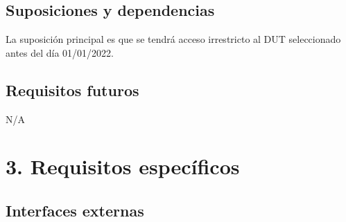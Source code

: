 \documentclass[
11pt, %
codirector, %
]{charter}
\begin{document}
\subsection{Suposiciones y dependencias}
\label{sub:suposiciones}

La suposición principal es que se tendrá acceso irrestricto al DUT seleccionado antes del día 01/01/2022.

\subsection{Requisitos futuros}
\label{sub:futuro}

N/A

\section{3. Requisitos específicos}
\label{sec:requisitos}


\subsection{Interfaces externas}
\label{sub:interfaces}
\end{document}
